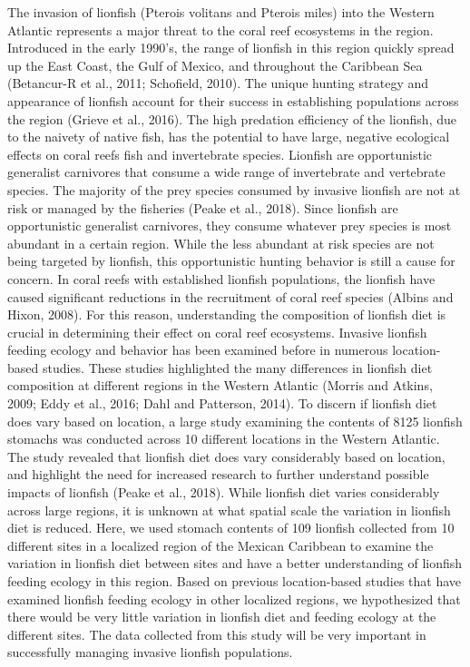 \documentclass[]{article}
\begin{document}
The invasion of lionfish (Pterois volitans and Pterois miles) into the
Western Atlantic represents a major threat to the coral reef ecosystems
in the region. Introduced in the early 1990's, the range of lionfish in
this region quickly spread up the East Coast, the Gulf of Mexico, and
throughout the Caribbean Sea (Betancur-R et al., 2011; Schofield, 2010).
The unique hunting strategy and appearance of lionfish account for their
success in establishing populations across the region (Grieve et al.,
2016). The high predation efficiency of the lionfish, due to the naivety
of native fish, has the potential to have large, negative ecological
effects on coral reefs fish and invertebrate species. Lionfish are
opportunistic generalist carnivores that consume a wide range of
invertebrate and vertebrate species. The majority of the prey species
consumed by invasive lionfish are not at risk or managed by the
fisheries (Peake et al., 2018). Since lionfish are opportunistic
generalist carnivores, they consume whatever prey species is most
abundant in a certain region. While the less abundant at risk species
are not being targeted by lionfish, this opportunistic hunting behavior
is still a cause for concern. In coral reefs with established lionfish
populations, the lionfish have caused significant reductions in the
recruitment of coral reef species (Albins and Hixon, 2008). For this
reason, understanding the composition of lionfish diet is crucial in
determining their effect on coral reef ecosystems. Invasive lionfish
feeding ecology and behavior has been examined before in numerous
location-based studies. These studies highlighted the many differences
in lionfish diet composition at different regions in the Western
Atlantic (Morris and Atkins, 2009; Eddy et al., 2016; Dahl and
Patterson, 2014). To discern if lionfish diet does vary based on
location, a large study examining the contents of 8125 lionfish stomachs
was conducted across 10 different locations in the Western Atlantic. The
study revealed that lionfish diet does vary considerably based on
location, and highlight the need for increased research to further
understand possible impacts of lionfish (Peake et al., 2018). While
lionfish diet varies considerably across large regions, it is unknown at
what spatial scale the variation in lionfish diet is reduced. Here, we
used stomach contents of 109 lionfish collected from 10 different sites
in a localized region of the Mexican Caribbean to examine the variation
in lionfish diet between sites and have a better understanding of
lionfish feeding ecology in this region. Based on previous
location-based studies that have examined lionfish feeding ecology in
other localized regions, we hypothesized that there would be very little
variation in lionfish diet and feeding ecology at the different sites.
The data collected from this study will be very important in
successfully managing invasive lionfish populations.
\end{document}
